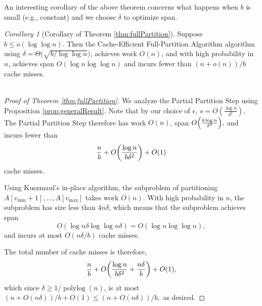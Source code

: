 \documentclass[11pt]{article}
\DeclarePairedDelimiter{\paren}{(}{)}
\newcommand{\polylog}{\operatorname{polylog}}
\theoremstyle{remark}
\newtheorem{corollary}[thm]{Corollary}
\theoremstyle{remark}
\begin{document}

An interesting corollary of the above theorem concerns what happens when $b$ is small (e.g., constant) and we choose $\delta$ to optimize span. 

\begin{corollary}[Corollary of Theorem \ref{thm:fullPartition}]
	\label{cor:fullPartition}
Suppose $b \le o(\log \log n)$. Then the Cache-Efficient Full-Partition Algorithm algorithm using $\delta = \Theta\big(\sqrt{b/\log\log n}\big)$, achieves work $O(n)$, and with high probability in $n$, achieves span $O(\log n \log\log n)$ and incurs fewer than $(n+o(n))/b$ cache misses.\\\\
\end{corollary}

\begin{proof}[Proof of Theorem \ref{thm:fullPartition}]
  
  We analyze the Partial Partition Step using Proposition
  \ref{prop:generalResult}. Note that by our choice of $\epsilon$,
  $s=O\left(\frac{\log n}{\delta^2}\right)$.  The Partial Partition
  Step therefore has work $O(n)$, span $O\paren*{\frac{b\log
      n}{\delta^2}},$ and incurs fewer than
	$$\frac{n}{b}+O\paren*{\frac{\log n}{b\delta^2}}+O(1)$$ 
  cache misses.

  Using Kuszmaul's in-place algorithm, the subproblem of partitioning $A[v_{\text{min}} + 1], \ldots,
   A[v_{\text{max}}]$ takes work $O(n)$. With high probability in $n$,
  the subproblem has size less than $4n\delta$, which means that the subproblem
  achieves span
  $$O(\log n\delta \log\log n\delta) = O(\log n \log\log n),$$
  and incurs at most $O(n \delta / b)$ cache misses.

  The total number of cache misses is therefore,
  	$$\frac{n}{b}+O\paren*{\frac{\log n}{b\delta^2} +
    \frac{n\delta}{b}}+O(1),$$ which since $\delta \ge 1 /
  \polylog(n)$, is at most $(n+O(n\delta))/b + O(1) \le (n + O(n
  \delta)) / b,$ as desired.
\end{proof}
\end{document}
